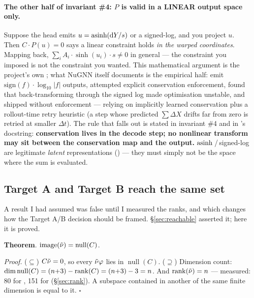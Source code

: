 \paragraph{The other half of invariant \#4: $P$ is valid in a LINEAR output
space only.} Suppose the head emits $u = \operatorname{asinh}(\mathrm{d} Y/s)$ or a signed-log, and
you project $u$. Then $C\cdot P(u) = 0$ says a linear constraint holds \emph{in
the warped coordinates}. Mapping back,
$\sum_i A_i \cdot \sinh(u_i)\cdot s \ne 0$ in general --- the constraint you
imposed is not the constraint you wanted. This mathematical argument is the
project's own \derivedhere; what NuGNN itself documents is the empirical half:
\citet{kim2026} emit $\mathrm{sign}(f)\cdot\log_{10}|f|$ outputs, attempted
explicit conservation enforcement, found that back-transforming through the
signed log made optimisation unstable, and shipped without enforcement ---
relying on implicitly learned conservation plus a rollout-time retry heuristic
(a step whose predicted $\sum\Delta X$ drifts far from zero is retried at
smaller $\Delta t$). The rule that falls out is stated in 
invariant \#4 and in 's docstring: \textbf{conservation lives
in the decode step; no nonlinear transform may sit between the conservation map
and the output.} $\operatorname{asinh}$\,/\,signed-log are legitimate \emph{latent}
representations () --- they must simply not be the space
where the sum is evaluated.

\subsection{Target A and Target B reach the same set}
\label{sec:equivalence}

A result I had assumed was false until I measured the ranks, and which changes
how the Target A/B decision should be framed. \S\ref{sec:reachable} asserted it;
here it is proved.

\begin{invariant}
\textbf{Theorem}\derivedhere. $\operatorname{image}(\tilde\nu) = \operatorname{null}(C)$.
\end{invariant}

\emph{Proof.} ($\subseteq$) $C\tilde\nu = 0$, so every $\tilde\nu\varphi$ lies in
$\operatorname{null}(C)$. ($\supseteq$) Dimension count:
$\dim\operatorname{null}(C) = (n{+}3) - \operatorname{rank}(C) = (n{+}3) - 3 = n$. And
$\operatorname{rank}(\tilde\nu) = n$ --- measured: 80 for , 151 for 
(\S\ref{sec:rank}). A subspace contained in another of the same finite dimension
is equal to it. $\square$

